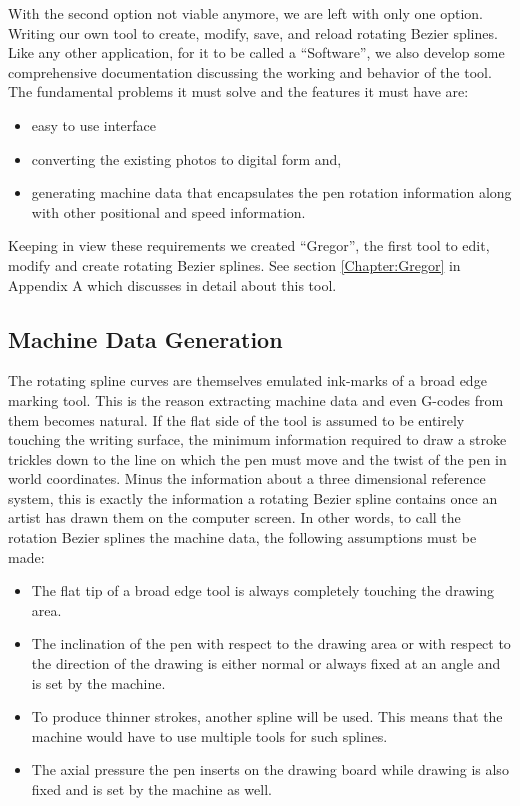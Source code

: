 With the second option not viable anymore, we are left with only one option. Writing our own tool to create, modify, save, and reload rotating Bezier splines. Like any other application, for it to be called a “Software”, we also develop some comprehensive documentation discussing the working and behavior of the tool. The fundamental problems it must solve and the features it must have are:

\begin{itemize}
\item easy to use interface
\item converting the existing photos to digital form and,
\item generating machine data that encapsulates the pen rotation information along with other positional and speed information.
\end{itemize}

Keeping in view these requirements we created “Gregor”, the first tool to edit, modify and create rotating Bezier splines. See section \ref{Chapter:Gregor} in Appendix A which discusses in detail about this tool.

\subsection{Machine Data Generation}
\label{ExplorationPoints1}
The rotating spline curves are themselves emulated ink-marks of a broad edge marking tool. This is the reason extracting machine data and even G-codes from them becomes natural. If the flat side of the tool is assumed to be entirely touching the writing surface, the minimum information required to draw a stroke trickles down to the line on which the pen must move and the twist of the pen in world coordinates. Minus the information about a three dimensional reference system, this is exactly the information a rotating Bezier spline contains once an artist has drawn them on the computer screen. In other words, to call the rotation Bezier splines the machine data, the following assumptions must be made:
\begin{itemize}
	\item The flat tip of a broad edge tool is always completely touching the drawing area.
	\item The inclination of the pen with respect to the drawing area or with respect to the direction of the drawing is either normal or always fixed at an angle and is set by the machine.
	\item To produce thinner strokes, another spline will be used. This means that the machine would have to use multiple tools for such splines.
	\item The axial pressure the pen inserts on the drawing board while drawing is also fixed and is set by the machine as well.
\end{itemize} 

